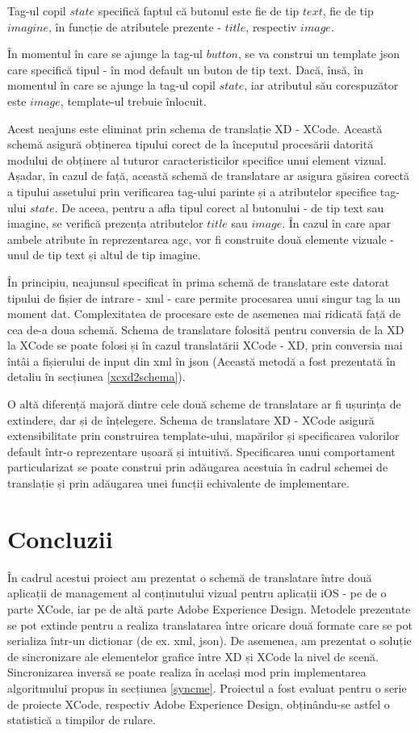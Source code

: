 Tag-ul copil $state$ specifică faptul că butonul este fie de tip $text$, fie de tip $imagine$, în funcție de atributele prezente - $title$, respectiv $image$.

În momentul în care se ajunge la tag-ul $button$, se va construi un template json care specifică tipul - în mod default un buton de tip text. Dacă, însă, în momentul în care se ajunge la tag-ul copil $state$, iar atributul său corespuzător este $image$, template-ul trebuie înlocuit.

Acest neajuns este eliminat prin schema de translație XD - XCode. Această schemă asigură obținerea tipului corect de la începutul procesării datorită modului de obținere al tuturor caracteristicilor specifice unui element vizual. 
Așadar, în cazul de față, această schemă de translatare ar asigura găsirea corectă a tipului assetului prin verificarea tag-ului parinte și a atributelor specifice tag-ului $state$. De aceea, pentru a afla tipul corect al butonului - de tip text sau imagine, se verifică prezența atributelor $title$ sau $image$. În cazul în care apar ambele atribute în reprezentarea agc, vor fi construite două elemente vizuale - unul de tip text și altul de tip imagine. 

În principiu, neajunsul specificat în prima schemă de translatare este datorat tipului de fișier de intrare - xml - care permite procesarea unui singur tag la un moment dat. Complexitatea de procesare este de asemenea mai ridicată față de cea de-a doua schemă.
Schema de translatare folosită pentru conversia de la XD la XCode se poate folosi și în cazul translatării XCode - XD, prin conversia mai întâi a fișierului de input din xml în json (Această metodă a fost prezentată în detaliu în secțiunea \ref{xcxd2schema}).

O altă diferență majoră dintre cele două scheme de translatare ar fi ușurința de extindere, dar și de înțelegere. Schema de translatare XD - XCode asigură extensibilitate prin construirea template-ului, mapărilor și specificarea valorilor default într-o reprezentare ușoară și intuitivă. Specificarea unui comportament particularizat se poate construi prin adăugarea acestuia în cadrul schemei de translație și prin adăugarea unei funcții echivalente de implementare. 

\chapter{Concluzii}

În cadrul acestui proiect am prezentat o schemă de translatare între două aplicații de management al conținutului vizual pentru aplicații iOS - pe de o parte XCode, iar pe de altă parte Adobe Experience Design. Metodele prezentate se pot extinde pentru a realiza translatarea între oricare două formate care se pot serializa într-un dictionar (de ex. xml, json). De asemenea, am prezentat o soluție de sincronizare ale elementelor grafice între XD și XCode la nivel de scenă. Sincronizarea inversă se poate realiza în același mod prin implementarea algoritmului propus în secțiunea \ref{syncme}. Proiectul a fost evaluat pentru o serie de proiecte XCode, respectiv Adobe Experience Design, obținându-se astfel o statistică a timpilor de rulare.

